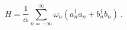 \begin{equation}
H = \frac{1}{\alpha} \sum_{n= -\infty}^{\infty} 
{\omega_n} (a_{n}^{\dagger} a_n + b_{n}^{\dagger} b_n)~.
\label{hami}
\end{equation}

